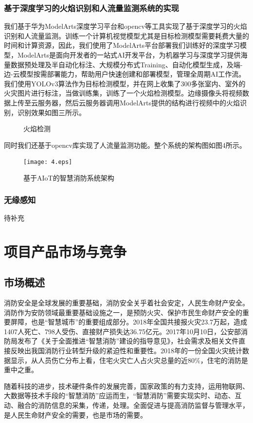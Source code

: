 \documentclass{ctexart}
\begin{document}
	\subsubsection{基于深度学习的火焰识别和人流量监测系统的实现}
	我们基于华为ModelArts深度学习平台和opencv等工具实现了基于深度学习的火焰识别和人流量监测。训练一个计算机视觉模型尤其是目标检测模型需要耗费大量的时间和计算资源，因此，我们使用了ModelArts平台部署我们训练好的深度学习模型，ModelArts是面向开发者的一站式AI开发平台，为机器学习与深度学习提供海量数据预处理及半自动化标注、大规模分布式Training、自动化模型生成，及端-边-云模型按需部署能力，帮助用户快速创建和部署模型，管理全周期AI工作流。我们使用YOLOv3算法作为目标检测模型，并在网上收集了300多张室内、室外的火灾图片进行标注，当做训练集，训练了一个火焰检测模型。边缘摄像头将视频数据上传至云服务器，然后云服务器调用ModelArts提供的结构进行视频中的火焰识别，识别效果如图三所示。\par
	\begin{figure}
		\centering
		\caption{火焰检测}
		\label{火焰检测}
	\end{figure}
	同时我们还基于opencv库实现了人流量监测功能。整个系统的架构图如图4所示。
	\begin{figure}
		\centering
		\texttt{[image: 4.eps]}
		\caption{基于AIoT的智慧消防系统架构}
		\label{图1}
	\end{figure}
	\subsubsection{无缘感知}
	待补充	
	\section{项目产品市场与竞争}
	\subsection{市场概述}
	消防安全是全球发展的重要基础，消防安全关乎着社会安定，人民生命财产安全。消防作为安防领域最重要基础设施之一，是预防火灾、保护市民生命财产安全的重要屏障，也是“智慧城市”的重要组成部分。2018年全国共接报火灾23.7万起，造成1407人死亡、798人受伤、直接财产损失达36.75亿元。2017年10月10日，公安部消防局发布了《关于全面推进“智慧消防”建设的指导意见》，社会需求及相关文件直接反映出我国消防行业转型升级的紧迫性和重要性。2018年的一份全国火灾统计数据显示，从人员伤亡分布上看，住宅火灾亡人占火灾总量的近80\%，住宅的消防是重中之重。 \par
	随着科技的进步，技术硬件条件的发展完善，国家政策的有力支持，运用物联网、大数据等技术手段的“智慧消防”应运而生，“智慧消防”需要实现实时、动态、互动、融合的消防信息的采集，传递，处理。全面促进与提高消防监督与管理水平，是人民生命财产安全的需要，也是市场的需要。
\end{document}
